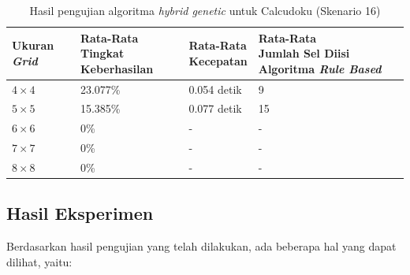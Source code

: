 \begin{table}
\centering
\captionsetup{justification=centering}
\caption[Hasil pengujian algoritma \textit{hybrid genetic} untuk Calcudoku (Skenario 16)]{Hasil pengujian algoritma \textit{hybrid genetic} untuk Calcudoku (Skenario 16)}
\begin{tabular}{| l | l | l | l |}
\hline
Ukuran \textit{Grid} & \makecell[l]{Rata-Rata \\ Tingkat Keberhasilan} & \makecell[l]{Rata-Rata \\ Kecepatan} & \makecell[l]{Rata-Rata \\ Jumlah Sel Diisi Algoritma \textit{Rule Based}} \\
\hline \hline
\begin{math}4 \times 4\end{math} & 23.077\% & 0.054 detik & 9 \\
\hline
\begin{math}5 \times 5\end{math} & 15.385\% & 0.077 detik & 15 \\
\hline
\begin{math}6 \times 6\end{math} & 0\% & - & - \\
\hline
\begin{math}7 \times 7\end{math} & 0\% & - & - \\
\hline
\begin{math}8 \times 8\end{math} & 0\% & - & - \\
\hline
\end{tabular}
\label{tab:pengujianhg16}
\end{table}
\clearpage

\subsection{Hasil Eksperimen}
\label{sec:hasileksperimen}

Berdasarkan hasil pengujian yang telah dilakukan, ada beberapa hal yang dapat dilihat, yaitu:

